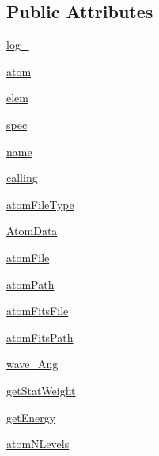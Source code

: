 \subsection*{Public Attributes}
\begin{DoxyCompactItemize}
\item 
\hyperlink{classpyneb_1_1core_1_1pynebcore_1_1_atom_afd87151907f32bc0dc45f0171b61374e}{log\+\_\+}
\item 
\hyperlink{classpyneb_1_1core_1_1pynebcore_1_1_atom_a0c5c7091b1d8a95d9bee2744d713f5c9}{atom}
\item 
\hyperlink{classpyneb_1_1core_1_1pynebcore_1_1_atom_a62e73dc66c7aff7941c5ce94e808c23a}{elem}
\item 
\hyperlink{classpyneb_1_1core_1_1pynebcore_1_1_atom_adaf1b66faf18504ec4b5c8c0b7f6763b}{spec}
\item 
\hyperlink{classpyneb_1_1core_1_1pynebcore_1_1_atom_ab74e6bf80237ddc4109968cedc58c151}{name}
\item 
\hyperlink{classpyneb_1_1core_1_1pynebcore_1_1_atom_ab25fa7ebe84b603684dee62410c1e34c}{calling}
\item 
\hyperlink{classpyneb_1_1core_1_1pynebcore_1_1_atom_ad25761817a2ae4417305b5ac84633a6f}{atom\+File\+Type}
\item 
\hyperlink{classpyneb_1_1core_1_1pynebcore_1_1_atom_a7950e5502817549deb71dd14b52c1c4d}{Atom\+Data}
\item 
\hyperlink{classpyneb_1_1core_1_1pynebcore_1_1_atom_afa3c4660b3bcf1e2c199413048b9209e}{atom\+File}
\item 
\hyperlink{classpyneb_1_1core_1_1pynebcore_1_1_atom_a18178a28ecf0c7f251d0974c2097b214}{atom\+Path}
\item 
\hyperlink{classpyneb_1_1core_1_1pynebcore_1_1_atom_a80c24f287a25f67b489b472164691ea6}{atom\+Fits\+File}
\item 
\hyperlink{classpyneb_1_1core_1_1pynebcore_1_1_atom_a8d37532338fe8cf09d17000a7ae46d53}{atom\+Fits\+Path}
\item 
\hyperlink{classpyneb_1_1core_1_1pynebcore_1_1_atom_ab5130f33e76a12670614a4ecf47211b0}{wave\+\_\+\+Ang}
\item 
\hyperlink{classpyneb_1_1core_1_1pynebcore_1_1_atom_a76da9219880b92ab31bfbff268b9ddc9}{get\+Stat\+Weight}
\item 
\hyperlink{classpyneb_1_1core_1_1pynebcore_1_1_atom_a25f8bf6829f1707a2e51c73ed35c8301}{get\+Energy}
\item 
\hyperlink{classpyneb_1_1core_1_1pynebcore_1_1_atom_ae9ca7d9b8e6463826cd148ff606cbc1c}{atom\+N\+Levels}

\end{DoxyCompactItemize}
